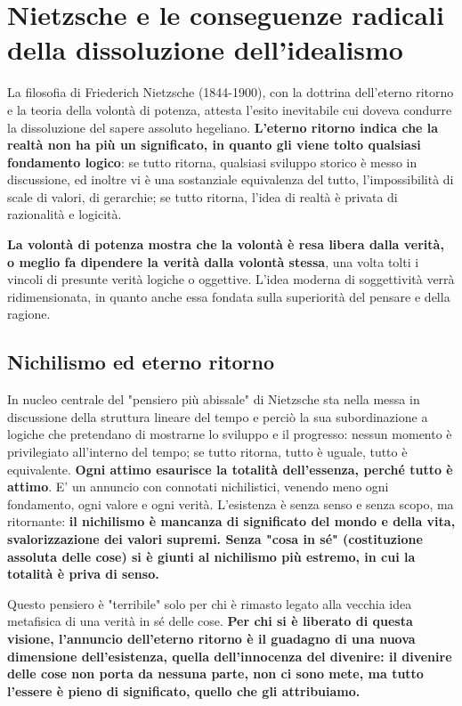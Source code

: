 \chapter{Nietzsche e le conseguenze radicali della dissoluzione dell'idealismo}
\bigskip
\bigskip
\bigskip
\bigskip
\bigskip
\bigskip


La filosofia di Friederich Nietzsche (1844-1900), con la dottrina dell'eterno ritorno e la teoria della volontà di potenza, attesta l'esito inevitabile cui doveva condurre la dissoluzione del sapere assoluto hegeliano. \textbf{L'eterno ritorno indica che la realtà non ha più un significato, in quanto gli viene tolto qualsiasi fondamento logico}: se tutto ritorna, qualsiasi sviluppo storico è messo in discussione, ed inoltre vi è una sostanziale equivalenza del tutto, l'impossibilità di scale di valori, di gerarchie; se tutto ritorna,  l'idea di realtà è privata di razionalità e logicità.

\textbf{La volontà di potenza mostra che la volontà è resa libera dalla verità, o meglio fa dipendere la verità dalla volontà stessa}, una volta tolti i vincoli di presunte verità logiche o oggettive. L'idea moderna di soggettività verrà ridimensionata, in quanto anche essa fondata sulla superiorità del pensare e della ragione.

\section{Nichilismo ed eterno ritorno}

In nucleo centrale del "pensiero più abissale" di Nietzsche sta nella messa in discussione della struttura lineare del tempo e perciò la sua subordinazione a logiche che pretendano di mostrarne lo sviluppo e il progresso: nessun momento è privilegiato all'interno del tempo; se tutto ritorna, tutto è uguale, tutto è equivalente. \textbf{Ogni attimo esaurisce la totalità dell'essenza, perché tutto è attimo}.
E' un annuncio con connotati nichilistici, venendo meno ogni fondamento, ogni valore e ogni verità. L'esistenza è senza senso e senza scopo, ma ritornante: \textbf{il nichilismo è  mancanza di significato del mondo e della vita, svalorizzazione dei valori supremi. Senza "cosa in sé" (costituzione assoluta delle cose) si è giunti al nichilismo più estremo, in cui la totalità è priva di senso.}

Questo pensiero è "terribile" solo per chi è rimasto legato alla vecchia idea metafisica di una verità in sé delle cose. \textbf{Per chi si è liberato di questa visione, l'annuncio dell'eterno ritorno è il guadagno di una nuova dimensione dell'esistenza, quella dell'innocenza del divenire: il divenire delle cose non porta da nessuna parte, non ci sono mete, ma tutto l'essere è pieno di significato, quello che gli attribuiamo.}

